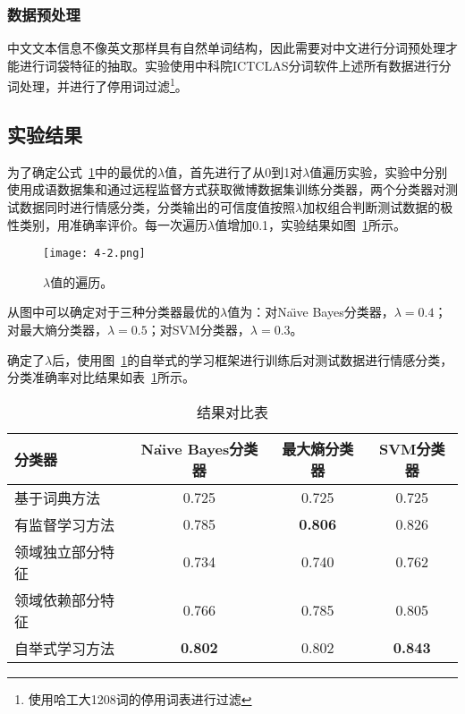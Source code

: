 \subsubsection{数据预处理}
中文文本信息不像英文那样具有自然单词结构，因此需要对中文进行分词预处理才能进行词袋特征的抽取。实验使用中科院ICTCLAS分词软件上述所有数据进行分词处理，并进行了停用词过滤\footnote{使用哈工大1208词的停用词表进行过滤}。

\subsection{实验结果}
\label{result}

为了确定公式~\ref{fig4-2}中的最优的$ \lambda $值，首先进行了从0到1对$ \lambda $值遍历实验，实验中分别使用成语数据集和通过远程监督方式获取微博数据集训练分类器，两个分类器对测试数据同时进行情感分类，分类输出的可信度值按照$\lambda $加权组合判断测试数据的极性类别，用准确率评价。每一次遍历$ \lambda $值增加0.1，实验结果如图~\ref{fig4-2}所示。

\begin{figure}[htp]
\centering
\texttt{[image: 4-2.png]}
\caption{$ \lambda $值的遍历。}
\label{fig4-2}
\end{figure}
从图中可以确定对于三种分类器最优的$ \lambda $值为：对Na\"\i ve Bayes分类器，$ \lambda=0.4 $；对最大熵分类器，$ \lambda=0.5 $；对SVM分类器，$ \lambda=0.3 $。

确定了$ \lambda$后，使用图~\ref{fig4-2}的自举式的学习框架进行训练后对测试数据进行情感分类，分类准确率对比结果如表~\ref{tab4-1}所示。

\begin{table}[htp]
\caption{结果对比表}
\label{tab4-1}
\centering
\begin{tabular}{|l|c|c|c|}
\hline
分类器 &  Na\"\i ve Bayes分类器    &   最大熵分类器    &   SVM分类器    \\
\hline

基于词典方法 & 0.725 & 0.725 & 0.725 \\
\hline
有监督学习方法 & 0.785 & \textbf{0.806} & 0.826 \\
\hline
领域独立部分特征 & 0.734 &  0.740 & 0.762 \\
\hline
领域依赖部分特征 & 0.766 & 0.785 & 0.805 \\
\hline
自举式学习方法 & \textbf{0.802} & 0.802 & \textbf{0.843} \\
\hline
\end{tabular}
\end{table}


